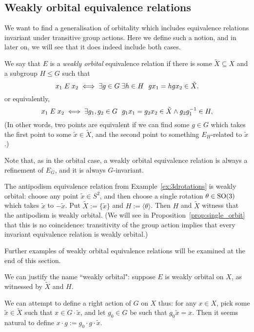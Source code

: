 	\subsection*{Weakly orbital equivalence relations}
	We want to find a generalisation of orbitality which includes equivalence relations invariant under transitive group actions. Here we define such a notion, and in later on, we will see that it does indeed include both cases.
	
	\begin{dfn}
		\label{dfn:worb}
		We say that $E$ is a \emph{weakly orbital} equivalence relation if there is some $\tilde X\subseteq X$ and a subgroup $H\leq G$ such that
		\[
		x_1\mathrel{E} x_2 \iff \exists g\in G \; \exists h\in H \ \ gx_1=hgx_2\in \tilde X.
		\]
		or equivalently,
		\[
		x_1\Er x_2\iff \exists g_1,g_2\in G\ \ g_1x_1=g_2x_2\in\tilde X\land g_2g_1^{-1}\in H,
		\]
		(In other words, two points are equivalent if we can find some $g\in G$ which takes the first point to some $\tilde x\in \tilde X$, and the second point to something $E_H$-related to $\tilde x$.)\xqed{\lozenge}
	\end{dfn}
	
	Note that, as in the orbital case, a weakly orbital equivalence relation is always a refinement of $E_G$, and it is always $G$-invariant.
	
	\begin{ex}
		The antipodism equivalence relation from Example~\ref{ex:3drotations} is weakly orbital: choose any point $\tilde x\in S^2$, and then choose a single rotation $\theta\in \operatorname{{SO}}(3)$ which takes $\tilde x$ to $-\tilde x$. Put $\tilde X:=\{\tilde x\}$ and $H:=\langle \theta\rangle$. Then $H$ and $\tilde X$ witness that the antipodism is weakly orbital. (We will see in Proposition~\ref{prop:single_orbit} that this is no coincidence: transitivity of the group action implies that every invariant equivalence relation is weakly orbital.)\xqed{\lozenge}
	\end{ex}
	
	Further examples of weakly orbital equivalence relations will be examined at the end of this section.
	
	
	We can justify the name ``weakly orbital": suppose $E$ is weakly orbital on $X$, as witnessed by $\tilde X$ and $H$.
	
	We can attempt to define a right action of $G$ on $X$ thus: for any $x\in X$, pick some $\tilde x\in \tilde X$ such that $x\in G\cdot\tilde x$, and let $g_0\in G$ be such that $g_0\tilde x=x$. Then it seems natural to define $x\cdot g:=g_0\cdot g\cdot \tilde x$.
	
